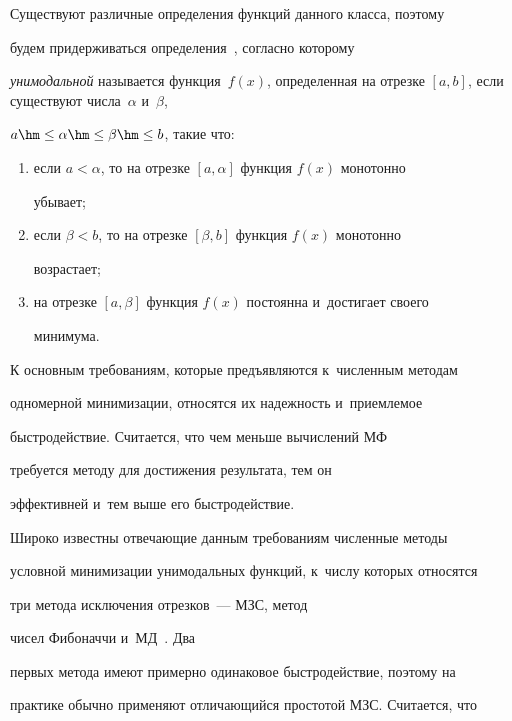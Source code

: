   


  Существуют различные определения функций данного класса, поэтому 


будем придерживаться определения~\cite{3-kod}, согласно которому 


\textit{унимодальной} называется функция~$f(x)$, определенная на отрезке $[a, 


b]$, если существуют числа~$\alpha$ и~$\beta$, 


$a\hm\leq\alpha\hm\leq\beta\hm\leq b$, такие что:


  \begin{enumerate}[(1)]


    \item если $a<\alpha$, то на отрезке $[a, \alpha]$ функция $f(x)$ монотонно 


убывает;


    \item если $\beta<b$, то на отрезке $[\beta, b]$ функция $f(x)$ монотонно 


возрастает;


    \item на отрезке $[a, \beta]$ функция $f(x)$ постоянна и~достигает своего 


минимума.


    \end{enumerate}


    


  К основным требованиям, которые предъявляются к~численным методам 


одномерной минимизации, относятся их надежность и~приемлемое 


быстродействие. Считается, что чем меньше вычислений МФ 


требуется методу для достижения результата, тем он 


эффективней и~тем выше его быстродействие. 


  


  Широко известны отвечающие данным требованиям численные методы 


условной минимизации унимодальных функций, к~числу которых относятся 


три метода исключения отрезков~--- МЗС, метод 


чисел Фибоначчи и~МД~\cite{4-kod, 5-kod, 6-kod}. Два 


первых метода имеют примерно одинаковое быстродействие, поэтому на 


практике обычно применяют отличающийся прос\-то\-той МЗС. Считается, что 


